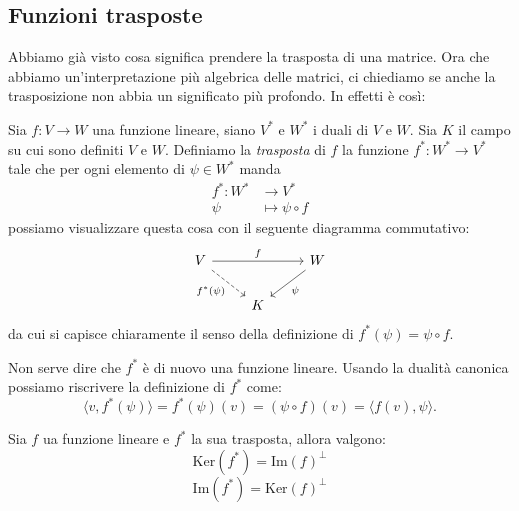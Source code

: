 \documentclass[11pt]{scrartcl}
\newcommand{\Immagine}[1]{\text{Im}\left(#1\right)}
\renewcommand{\ker}[1]{\text{Ker}\left(#1\right)}
\begin{document}
   	 \subsection{Funzioni trasposte}
   	 
   	 Abbiamo già visto cosa significa prendere la trasposta di una matrice. Ora che abbiamo un'interpretazione più algebrica delle matrici, ci chiediamo se anche la trasposizione non abbia un significato più profondo. In effetti è così:
   	 \begin{definition}
   	 	Sia $f:V\to W$ una funzione lineare, siano $V^*$ e $W^*$ i duali di $V$ e $W$. Sia $K$ il campo su cui sono definiti $V$ e $W$. Definiamo la \textit{trasposta} di $f$ la funzione $f^*:W^*\to V^*$ tale che per ogni elemento di $\psi\in W^*$ manda
   	 	\begin{align*}
   	 		f^*:W^*& \to   V^* \\
   	 		\psi & \mapsto \psi\circ f
   	 	\end{align*}
   	 	possiamo visualizzare questa cosa con il seguente diagramma commutativo:
   	 	$$
   	 	\begin{tikzcd}
   	 		V \arrow[rr,"f"]\arrow[rd,dashed,"f^*(\psi)",swap] & & W \arrow[ld,"\psi"] \\
   	 		  & K &
   	 	\end{tikzcd}
   	 	$$ 
   	 	da cui si capisce chiaramente il senso della definizione di $f^*(\psi)=\psi\circ f$.
   	 \end{definition}
   	 Non serve dire che $f^*$ è di nuovo una funzione lineare. Usando la dualità canonica possiamo riscrivere la definizione di $f^*$ come:
   	 $$\langle v,f^*(\psi) \rangle=f^*(\psi)(v)=(\psi\circ f)(v)=\langle f(v),\psi \rangle.$$
   	 \begin{proposition}
   	 	Sia $f$ ua funzione lineare e $f^*$ la sua trasposta, allora valgono:
   	 	$$\ker{f^*}=\Immagine{f}^\perp$$
   	 	$$\Immagine{f^*}=\ker{f}^\perp$$
   	 \end{proposition}
\end{document}
